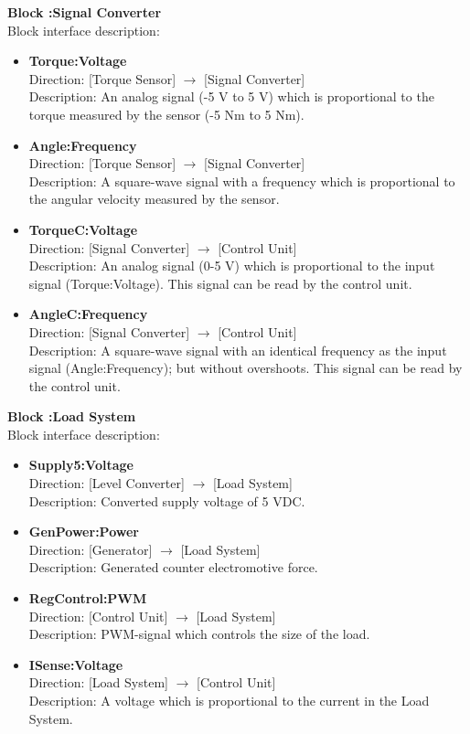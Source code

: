 \textbf{Block :Signal Converter}\\
Block interface description:
\begin{itemize}
	\item \textbf{Torque:Voltage}\\
	Direction: [Torque Sensor] $\rightarrow$ [Signal Converter]\\
	Description: An analog signal (-5 V to 5 V) which is proportional to the torque measured by the sensor (-5 Nm to 5 Nm).
	\item \textbf{Angle:Frequency}\\
	Direction: [Torque Sensor] $\rightarrow$ [Signal Converter]\\
	Description: A square-wave signal with a frequency which is proportional to the angular velocity measured by the sensor.
	\item \textbf{TorqueC:Voltage}\\
	Direction: [Signal Converter] $\rightarrow$ [Control Unit]\\
	Description: An analog signal (0-5 V) which is proportional to the input signal (Torque:Voltage). This signal can be read by the control unit.
	\item \textbf{AngleC:Frequency}\\
	Direction: [Signal Converter] $\rightarrow$ [Control Unit]\\
	Description: A square-wave signal with an identical frequency as the input signal (Angle:Frequency); but without overshoots. This signal can be read by the control unit.
\end{itemize}
							
\textbf{Block :Load System}\\ 
Block interface description:
\begin{itemize}
	\item \textbf{Supply5:Voltage}\\
	Direction: [Level Converter] $\rightarrow$ [Load System]\\
	Description: Converted supply voltage of 5 VDC.
	\item \textbf{GenPower:Power}\\
	Direction: [Generator] $\rightarrow$ [Load System]\\
	Description: Generated counter electromotive force.
	\item \textbf{RegControl:PWM}\\
	Direction: [Control Unit] $\rightarrow$ [Load System]\\
	Description: PWM-signal which controls the size of the load.
	\item \textbf{ISense:Voltage}\\
	Direction: [Load System] $\rightarrow$ [Control Unit]\\
	Description: A voltage which is proportional to the current in the Load System.
\end{itemize}
								
